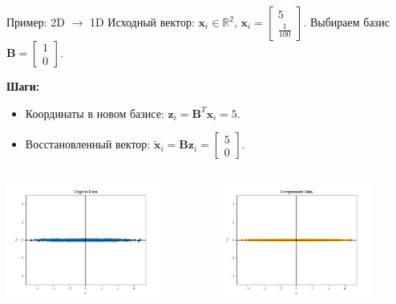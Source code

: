 \begin{frame}{Пример: 2D \(\to\) 1D}
    Исходный вектор: $\boldsymbol{x}_i \in \mathbb{R}^2$, $\boldsymbol{x}_i = \begin{bmatrix} 5 \\ \frac{1}{100} \end{bmatrix}$.
    Выбираем базис $\mathbf{B} = \begin{bmatrix} 1 \\ 0 \end{bmatrix}$.

    \textbf{Шаги:}
    \begin{itemize}
        \item Координаты в новом базисе: $\boldsymbol{z}_i = \mathbf{B}^T\boldsymbol{x}_i = 5.$
        \item Восстановленный вектор: $\tilde{\boldsymbol{x}}_i = \mathbf{B}\boldsymbol{z}_i = \begin{bmatrix} 5 \\ 0 \end{bmatrix}.$
    \end{itemize}

    \begin{columns}
        \includegraphics[width=0.8\textwidth]{../resources/pca/simple_example.png}

        \includegraphics[width=0.8\textwidth]{../resources/pca/simple_example_comp.png}
    \end{columns}
\end{frame}

